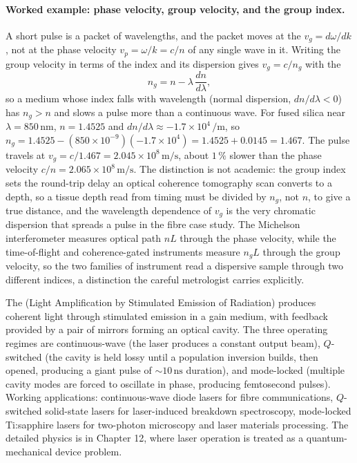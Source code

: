 \paragraph{Worked example: phase velocity, group velocity, and the group index.}
A short pulse is a packet of wavelengths, and the packet moves at the
 $v_g = d\omega/dk$, not at the phase velocity
$v_p = \omega/k = c/n$ of any single wave in it. Writing the group velocity in
terms of the index and its dispersion gives $v_g = c/n_g$ with the
\[
n_g = n - \lambda\,\frac{dn}{d\lambda},
\]
so a medium whose index falls with wavelength (normal dispersion,
$dn/d\lambda < 0$) has $n_g > n$ and slows a pulse more than a continuous wave. For
fused silica near $\lambda = 850\,\si{\nano\meter}$, $n = 1.4525$ and
$dn/d\lambda \approx -1.7\times 10^{4}\,\si{\per\meter}$, so
$n_g = 1.4525 - (850\times 10^{-9})(-1.7\times 10^{4}) = 1.4525 + 0.0145 = 1.467$.
The pulse travels at $v_g = c/1.467 = 2.045\times 10^{8}\,\si{\meter\per\second}$,
about $1\,\%$ slower than the phase velocity $c/n = 2.065\times
10^{8}\,\si{\meter\per\second}$. The distinction is not academic: the group index
sets the round-trip delay an optical coherence tomography scan converts to a
depth, so a tissue depth read from timing must be divided by $n_g$, not $n$, to
give a true distance, and the wavelength dependence of $v_g$ is the very chromatic
dispersion that spreads a pulse in the fibre case study. The Michelson
interferometer measures optical path $n L$ through the phase velocity, while the
time-of-flight and coherence-gated instruments measure $n_g L$ through the group
velocity, so the two families of instrument read a dispersive sample through two
different indices, a distinction the careful metrologist carries explicitly.

The  (Light Amplification by Stimulated Emission of
Radiation) produces coherent light through stimulated emission in a
gain medium, with feedback provided by a pair of mirrors forming an
optical cavity. The three operating regimes are continuous-wave (the
laser produces a constant output beam), $Q$-switched (the cavity is
held lossy until a population inversion builds, then opened, producing
a giant pulse of $\sim 10\,\si{\nano\second}$ duration), and
mode-locked (multiple cavity modes are forced to oscillate in phase,
producing femtosecond pulses). Working applications: continuous-wave
diode lasers for fibre communications, $Q$-switched solid-state
lasers for laser-induced breakdown spectroscopy, mode-locked
Ti:sapphire lasers for two-photon microscopy and laser materials
processing. The detailed physics is in Chapter 12, where laser
operation is treated as a quantum-mechanical device problem.

